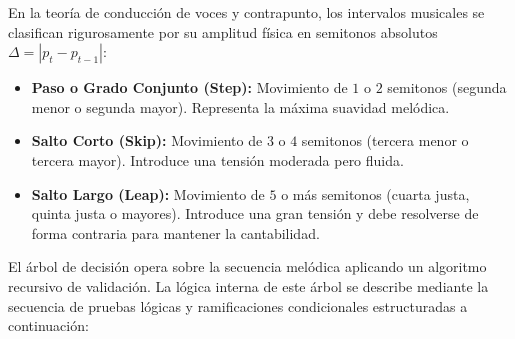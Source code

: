 En la teoría de conducción de voces y contrapunto, los intervalos musicales se clasifican rigurosamente por su amplitud física en semitonos absolutos $\Delta = |p_t - p_{t-1}|$:
\begin{itemize}
    \item \textbf{Paso o Grado Conjunto (Step):} Movimiento de $1$ o $2$ semitonos (segunda menor o segunda mayor). Representa la máxima suavidad melódica.
    \item \textbf{Salto Corto (Skip):} Movimiento de $3$ o $4$ semitonos (tercera menor o tercera mayor). Introduce una tensión moderada pero fluida.
    \item \textbf{Salto Largo (Leap):} Movimiento de $5$ o más semitonos (cuarta justa, quinta justa o mayores). Introduce una gran tensión y debe resolverse de forma contraria para mantener la cantabilidad.
\end{itemize}

El árbol de decisión opera sobre la secuencia melódica aplicando un algoritmo recursivo de validación. La lógica interna de este árbol se describe mediante la secuencia de pruebas lógicas y ramificaciones condicionales estructuradas a continuación:


